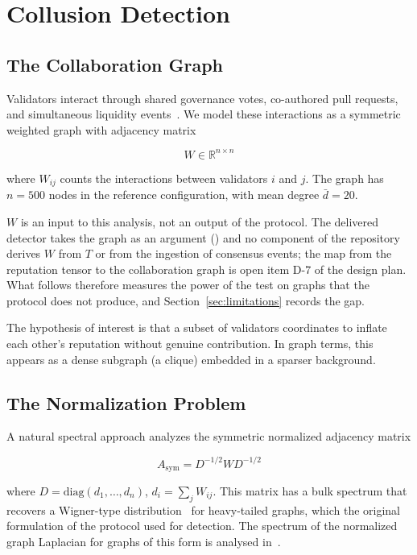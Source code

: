 \documentclass[11pt,a4paper]{article}
\newcommand{\spath}[1]{\path{#1}}
\numberwithin{equation}{section}
\numberwithin{table}{section}
\begin{document}
\section{Collusion Detection}
\label{sec:collusion}

\subsection{The Collaboration Graph}
Validators interact through shared governance votes, co-authored pull requests, and simultaneous liquidity events~\cite{kamvar2003,xiong2004}. We model these interactions as a symmetric weighted graph with adjacency matrix

\begin{equation}
W \in \mathbb{R}^{n \times n}
\label{eq:collab}
\end{equation}

where $W_{ij}$ counts the interactions between validators $i$ and $j$. The graph has $n = 500$ nodes in the reference configuration, with mean degree $\bar{d} = 20$.

$W$ is an input to this analysis, not an output of the protocol. The delivered detector takes the graph as an argument (\spath{src/rmt/src/detector.rs}) and no component of the repository derives $W$ from $T$ or from the ingestion of consensus events; the map from the reputation tensor to the collaboration graph is open item D-7 of the design plan. What follows therefore measures the power of the test on graphs that the protocol does not produce, and Section~\ref{sec:limitations} records the gap.

The hypothesis of interest is that a subset of validators coordinates to inflate each other's reputation without genuine contribution. In graph terms, this appears as a dense subgraph (a clique) embedded in a sparser background.

\subsection{The Normalization Problem}
A natural spectral approach analyzes the symmetric normalized adjacency matrix

\begin{equation}
A_{\mathrm{sym}} = D^{-1/2} W D^{-1/2}
\label{eq:asym}
\end{equation}

where $D = \mathrm{diag}(d_1, \ldots, d_n)$, $d_i = \sum_j W_{ij}$. This matrix has a bulk spectrum that recovers a Wigner-type distribution~\cite{wigner1958,bai2010} for heavy-tailed graphs, which the original formulation of the protocol used for detection. The spectrum of the normalized graph Laplacian for graphs of this form is analysed in~\cite{bauer2012}.
\end{document}
